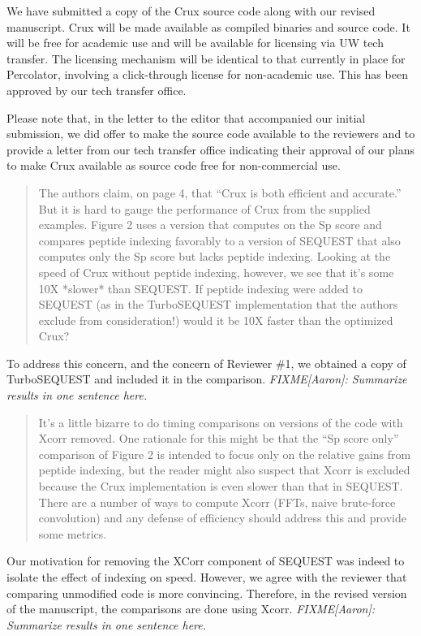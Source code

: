 \documentclass{article}
\newcommand{\breview}{\begin{quotation}\begin{em}\noindent}
\newcommand{\ereview}{\end{em}\end{quotation}}
\begin{document}
We have submitted a copy of the Crux source code along with our
revised manuscript.  Crux will be made available as compiled binaries
and source code.  It will be free for academic use and will be
available for licensing via UW tech transfer.  The licensing mechanism
will be identical to that currently in place for Percolator, involving
a click-through license for non-academic use.  This has been approved
by our tech transfer office.

Please note that, in the letter to the editor that accompanied our
initial submission, we did offer to make the source code available to
the reviewers and to provide a letter from our tech transfer office
indicating their approval of our plans to make Crux available as
source code free for non-commercial use.

\breview The authors claim, on page 4, that ``Crux is both efficient
and accurate.'' But it is hard to gauge the performance of Crux from
the supplied examples. Figure 2 uses a version that computes on the Sp
score and compares peptide indexing favorably to a version of SEQUEST
that also computes only the Sp score but lacks peptide
indexing. Looking at the speed of Crux without peptide indexing,
however, we see that it's some 10X *slower* than SEQUEST. If peptide
indexing were added to SEQUEST (as in the TurboSEQUEST implementation
that the authors exclude from consideration!) would it be 10X faster
than the optimized Crux? \ereview

To address this concern, and the concern of Reviewer \#1, we obtained
a copy of TurboSEQUEST and included it in the comparison. {\em
FIXME[Aaron]: Summarize results in one sentence here.}

\breview It's a little bizarre to do timing comparisons on versions of
the code with Xcorr removed. One rationale for this might be that the
``Sp score only'' comparison of Figure 2 is intended to focus only on
the relative gains from peptide indexing, but the reader might also
suspect that Xcorr is excluded because the Crux implementation is even
slower than that in SEQUEST. There are a number of ways to compute
Xcorr (FFTs, naive brute-force convolution) and any defense of
efficiency should address this and provide some metrics. \ereview

Our motivation for removing the XCorr component of SEQUEST was indeed
to isolate the effect of indexing on speed.  However, we agree with
the reviewer that comparing unmodified code is more convincing.
Therefore, in the revised version of the manuscript, the comparisons
are done using Xcorr. {\em FIXME[Aaron]: Summarize results in one
sentence here.}
\end{document}
